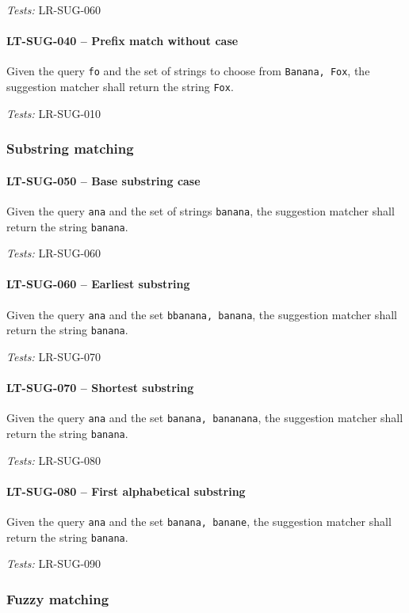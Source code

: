 \textit{Tests: } LR-SUG-060

\paragraph{LT-SUG-040 -- Prefix match without case}
Given the query \lstinline{fo} and the set of strings to choose from
\lstinline{Banana, Fox}, the suggestion matcher shall return
the string \lstinline{Fox}.

\textit{Tests: } LR-SUG-010

\subsubsection{Substring matching}
\paragraph{LT-SUG-050 -- Base substring case}
Given the query \lstinline{ana} and the set of strings
\lstinline{banana}, the suggestion matcher shall return the
string \lstinline{banana}.

\textit{Tests: } LR-SUG-060

\paragraph{LT-SUG-060 -- Earliest substring}
Given the query \lstinline{ana} and the set \lstinline{bbanana, banana},
the suggestion matcher shall return the string \lstinline{banana}.

\textit{Tests: } LR-SUG-070

\paragraph{LT-SUG-070 -- Shortest substring}
Given the query \lstinline{ana} and the set \lstinline{banana, bananana},
the suggestion matcher shall return the string \lstinline{banana}.

\textit{Tests: } LR-SUG-080

\paragraph{LT-SUG-080 -- First alphabetical substring}
Given the query \lstinline{ana} and the set \lstinline{banana, banane},
the suggestion matcher shall return the string \lstinline{banana}.

\textit{Tests: } LR-SUG-090

\subsubsection{Fuzzy matching}

